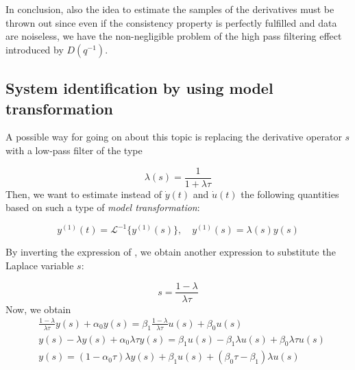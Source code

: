 In conclusion, also the idea to estimate the samples of the derivatives must be thrown out since even if the consistency property is perfectly fulfilled and data are noiseless, we have the non-negligible problem of the high pass filtering effect introduced by $D(q^{-1})$.

\subsection{System identification by using model transformation}
A possible way for going on about this topic is replacing the derivative operator $s$ with a low-pass filter of the type

\begin{equation}\label{eq:lambdat}
    \lambda(s)=\frac{1}{1+\lambda\tau}
\end{equation}
Then, we want to estimate instead of $\dot{y}(t)$ and $\dot{u}(t)$ the following quantities based on such a type of \textit{model transformation}: 

\begin{equation}
    y^{(1)}(t)=\mathcal{L}^{-1}\{y^{(1)}(s)\}, \quad y^{(1)}(s)=\lambda(s)y(s)
\end{equation}

\noindent
By inverting the expression of , we obtain another expression to substitute the Laplace variable $s$:

\begin{equation*}
    s=\frac{1-\lambda}{\lambda\tau}
\end{equation*}
Now, we obtain
\begin{align}
    &\frac{1-\lambda}{\lambda\tau} y(s) + \alpha_0{y(s)}=\beta_1 {\frac{1-\lambda}{\lambda\tau}} u(s) + \beta_0{u(s)}\\
    &y(s)-\lambda{y(s)}+\alpha_0\lambda\tau{y(s)}=\beta_1{u(s)}-\beta_1{\lambda}u(s)+\beta_0\lambda\tau{u(s)}\\
    &y(s)=(1-\alpha_0\tau)\lambda{y(s)} + \beta_1{u(s)}+(\beta_0\tau-\beta_1)\lambda{u(s)}\label{eq: last_step}
\end{align}

